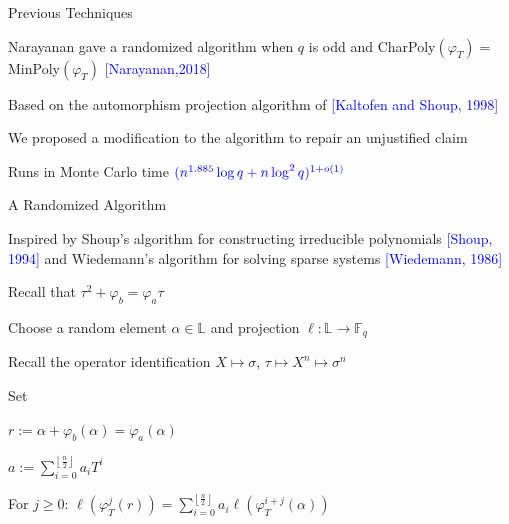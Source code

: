 \documentclass{beamer}
\newcommand{\f}{\mathbb{F}}
\newcommand{\blue}{\textcolor{blue}}
\newcommand{\spa}{\vspace{0.2cm}}
\begin{document}

\begin{frame}{Previous Techniques}

Narayanan gave a randomized algorithm when $q$ is odd and  CharPoly$(\varphi_T) = $ MinPoly$(\varphi_T)$ \blue{[Narayanan,2018]}

\spa

Based on the automorphism projection algorithm of \blue{[Kaltofen and Shoup, 1998]}

\spa

We proposed a modification to the algorithm to repair an unjustified claim

\spa

Runs in Monte Carlo time $\blue{(n^{1.885} \log q + n \log^2 q)^{1+o(1)}}$
    
\end{frame}


\begin{frame}{A Randomized Algorithm}


     Inspired by Shoup's algorithm for constructing irreducible polynomials \blue{[Shoup, 1994]} and Wiedemann's algorithm for solving sparse systems \blue{[Wiedemann, 1986]}
     
     \spa
     
    \item Recall that $\tau^2 + \varphi_b = \varphi_a \tau$
    
    
    \item Choose a random element $\alpha \in \mathbb{L}$ and projection $\ell : \mathbb{L} \to \f_q$
    \item Recall the operator identification $X \mapsto \sigma$, $\tau \mapsto X^n \mapsto \sigma^n$
    \item Set
    \item \centerline{$r := \alpha + \varphi_b(\alpha) = \varphi_a(\alpha)$}
    \item \centerline{$a := \sum_{i=0}^{\left\lfloor \frac{n}{2} \right\rfloor}a_iT^i$}
    
    \item For $j \geq 0$: $\ell(\varphi_T^j(r)) = \sum_{i = 0}^{\left\lfloor{\frac{n}{2}} \right\rfloor}a_i\ell(\varphi_T^{i+j}(\alpha))$
 
    
    \end{frame}
    
\end{document}
